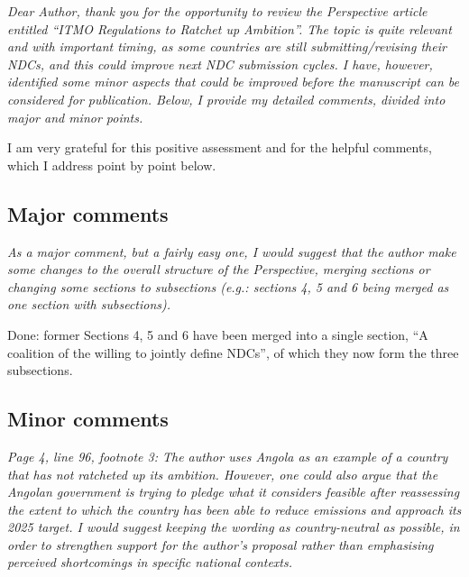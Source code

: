 \documentclass[11pt]{article}
\newenvironment{italic}{\itshape}{\par}
\begin{document}
\begin{italic}
Dear Author, thank you for the opportunity to review the Perspective article entitled ``ITMO Regulations to Ratchet up Ambition''. The topic is quite relevant and with important timing, as some countries are still submitting/revising their NDCs, and this could improve next NDC submission cycles. I have, however, identified some minor aspects that could be improved before the manuscript can be considered for publication. Below, I provide my detailed comments, divided into major and minor points.
\end{italic}



I am very grateful for this positive assessment and for the helpful comments, which I address point by point below.


\subsection*{Major comments}

\begin{italic}
As a major comment, but a fairly easy one, I would suggest that the author make some changes to the overall structure of the Perspective, merging sections or changing some sections to subsections (e.g.: sections 4, 5 and 6 being merged as one section with subsections).
\end{italic}

Done: former Sections 4, 5 and 6 have been merged into a single section, ``A coalition of the willing to jointly define NDCs'', of which they now form the three subsections.




\subsection*{Minor comments}

\begin{italic}
Page 4, line 96, footnote 3: The author uses Angola as an example of a country that has not ratcheted up its ambition. However, one could also argue that the Angolan government is trying to pledge what it considers feasible after reassessing the extent to which the country has been able to reduce emissions and approach its 2025 target. I would suggest keeping the wording as country-neutral as possible, in order to strengthen support for the author's proposal rather than emphasising perceived shortcomings in specific national contexts.
\end{italic}
\end{document}
